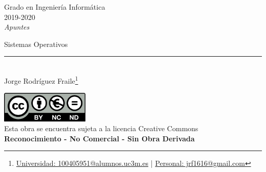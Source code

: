 \documentclass[12pt, twoside, openright]{report} %
\begin{document}
	
\begin{titlepage}
	\begin{sffamily}
	\color{azulUC3M}
	\begin{center}
		\begin{figure}[H] %
		\end{figure}
		\vspace{2.5cm}
		\begin{Large}
			Grado en Ingeniería Informática\\			
			2019-2020\\
			\vspace{2cm}		
			\textsl{Apuntes}\\
			\bigskip
		\end{Large}
		 	{\Huge Sistemas Operativos}\\
		 	\vspace*{0.5cm}
	 		\rule{10.5cm}{0.1mm}\\
			\vspace*{0.9cm}
			{\LARGE Jorge Rodríguez Fraile\footnote{\href{mailto:100405951@alumnos.uc3m.es}{Universidad: 100405951@alumnos.uc3m.es}  |  \href{mailto:jrf1616@gmail.com}{Personal: jrf1616@gmail.com}}}\\ 
			\vspace*{1cm}
	\end{center}
	\vfill
	\color{black}
		\includegraphics[width=4.2cm]{img/creativecommons.png}\\
		Esta obra se encuentra sujeta a la licencia Creative Commons\\ \textbf{Reconocimiento - No Comercial - Sin Obra Derivada}
	\end{sffamily}
\end{titlepage}


\tableofcontents
\thispagestyle{fancy}
\end{document}
